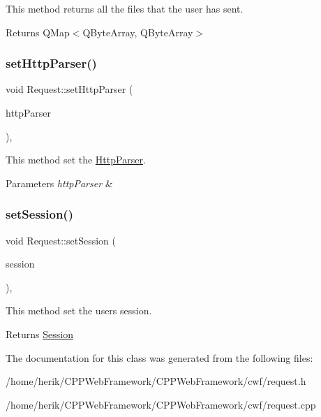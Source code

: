 This method returns all the files that the user has sent. 

\begin{DoxyReturn}{Returns}
Q\+Map$<$\+Q\+Byte\+Array, Q\+Byte\+Array$>$ 
\end{DoxyReturn}
\mbox{\label{class_request_a526593ca8b89c6871a36fefb0f2cde1a}} 
\subsubsection{\texorpdfstring{set\+Http\+Parser()}{setHttpParser()}}
{\footnotesize\ttfamily void Request\+::set\+Http\+Parser (\begin{DoxyParamCaption}\item[{\hyperlink{class_http_parser}{Http\+Parser} \&}]{http\+Parser }\end{DoxyParamCaption})\hspace{0.3cm}{\ttfamily [inline]}, {\ttfamily [noexcept]}}



This method set the \hyperlink{class_http_parser}{Http\+Parser}. 


\begin{DoxyParams}{Parameters}
{\em http\+Parser} & \\
\hline
\end{DoxyParams}
\mbox{\label{class_request_ab11b66e85291c653579fbba30bfa1a70}} 
\subsubsection{\texorpdfstring{set\+Session()}{setSession()}}
{\footnotesize\ttfamily void Request\+::set\+Session (\begin{DoxyParamCaption}\item[{\hyperlink{class_session}{Session} \&}]{session }\end{DoxyParamCaption})\hspace{0.3cm}{\ttfamily [inline]}, {\ttfamily [noexcept]}}



This method set the user\textquotesingle{}s session. 

\begin{DoxyReturn}{Returns}
\hyperlink{class_session}{Session} 
\end{DoxyReturn}


The documentation for this class was generated from the following files\+:\begin{DoxyCompactItemize}
\item 
/home/herik/\+C\+P\+P\+Web\+Framework/\+C\+P\+P\+Web\+Framework/cwf/request.\+h\item 
/home/herik/\+C\+P\+P\+Web\+Framework/\+C\+P\+P\+Web\+Framework/cwf/request.\+cpp\end{DoxyCompactItemize}
